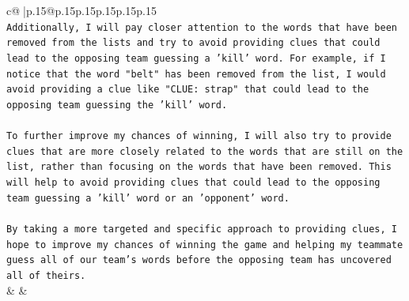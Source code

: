 \documentclass{article}
\begin{document}
{\begin{supertabular}{c@{$\;$}|p{.15\linewidth}@{}p{.15\linewidth}p{.15\linewidth}p{.15\linewidth}p{.15\linewidth}p{.15\linewidth}}
{{{\\ 
\texttt{Additionally, I will pay closer attention to the words that have been removed from the lists and try to avoid providing clues that could lead to the opposing team guessing a 'kill' word. For example, if I notice that the word "belt" has been removed from the list, I would avoid providing a clue like "CLUE: strap" that could lead to the opposing team guessing the 'kill' word.} \\
\\ 
\texttt{To further improve my chances of winning, I will also try to provide clues that are more closely related to the words that are still on the list, rather than focusing on the words that have been removed. This will help to avoid providing clues that could lead to the opposing team guessing a 'kill' word or an 'opponent' word.} \\
\\ 
\texttt{By taking a more targeted and specific approach to providing clues, I hope to improve my chances of winning the game and helping my teammate guess all of our team's words before the opposing team has uncovered all of theirs.} \\
            }
        }
    }
    & & \\ \\

\end{supertabular}
}
\end{document}
